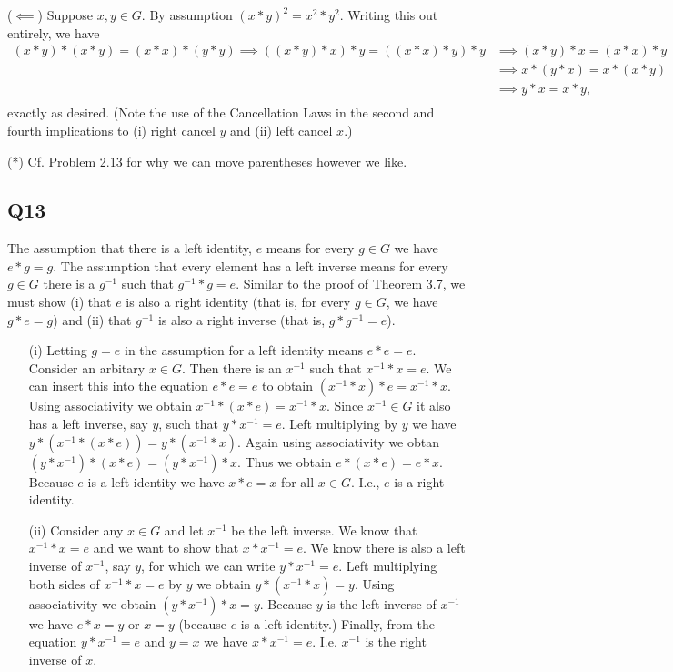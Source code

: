 \documentclass[12pt]{article}
\numberwithin{theorem}{section}
\numberwithin{equation}{section}
\numberwithin{remark}{section}
\numberwithin{definition}{section}
\numberwithin{theorem}{section}
\numberwithin{lemma}{section}
\numberwithin{example}{section}
\begin{document}
\vspace{\baselineskip}

\noindent ($\impliedby$) Suppose $x,y\in G$. By assumption $(x*y)^2=x^2*y^2$. Writing this out entirely, we have 
\begin{align*}
	(x*y)*(x*y)=(x*x)*(y*y) \implies ((x*y)*x)*y=((x*x)*y)*y & \implies (x*y)*x=(x*x)*y \\
	& \implies x*(y*x)=x*(x*y) \\
	& \implies y*x=x*y, \\	
\end{align*}
exactly as desired. (Note the use of the Cancellation Laws in the second and fourth implications to (i) right cancel $y$ and (ii) left cancel $x$.)

\vspace{\baselineskip}

\noindent (*) Cf. Problem 2.13 for why we can move parentheses however we like.



\subsection{Q13}

The assumption that there is a left identity, $e$ means for every $g\in G$ we have $e*g=g$. The assumption that every element has a left inverse means for every $g\in G$ there is a $g^{-1}$ such that $g^{-1}*g=e$. Similar to the proof of Theorem 3.7, we must show (i) that $e$ is also a right identity (that is, for every $g\in G$, we have $g*e=g$) and (ii) that $g^{-1}$ is also a right inverse (that is, $g*g^{-1}=e$). 

\begin{itemize}
	\item[(i)]{Letting $g=e$ in the assumption for a left identity means $e*e=e$. Consider an arbitary $x\in G$. Then there is an $x^{-1}$ such that $x^{-1}*x=e$. We can insert this into the equation $e*e=e$ to obtain $(x^{-1}*x)*e=x^{-1}*x$. Using associativity we obtain $x^{-1}*(x*e)=x^{-1}*x$. Since $x^{-1}\in G$ it also has a left inverse, say $y$, such that $y*x^{-1}=e$. Left multiplying by $y$ we have $y*(x^{-1}*(x*e))=y*(x^{-1}*x)$. Again using associativity we obtan $(y*x^{-1})*(x*e)=(y*x^{-1})*x$. Thus we obtain $e*(x*e)=e*x$. Because $e$ is a left identity we have $x*e=x$ for all $x\in G$. I.e., $e$ is a right identity.}
	\item[(ii)]{Consider any $x\in G$ and let $x^{-1}$ be the left inverse. We know that $x^{-1}*x=e$ and we want to show that $x*x^{-1}=e$. We know there is also a left inverse of $x^{-1}$, say $y$, for which we can write $y*x^{-1}=e$. Left multiplying both sides of $x^{-1}*x=e$ by $y$ we obtain $y*(x^{-1}*x)=y$. Using associativity we obtain $(y*x^{-1})*x=y$. Because $y$ is the left inverse of $x^{-1}$ we have $e*x=y$ or $x=y$ (because $e$ is a left identity.) Finally, from the equation $y*x^{-1}=e$ and $y=x$ we have $x*x^{-1}=e$. I.e. $x^{-1}$ is the right inverse of $x$.}
\end{itemize}
\end{document}
